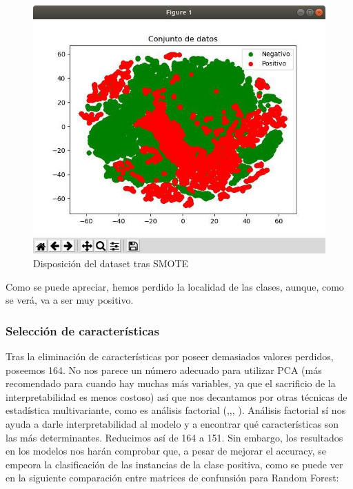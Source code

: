 \begin{figure}[H] %
	\centering
	\includegraphics[scale=0.55]{tras-smote.jpg}  %
	\caption{Disposición del dataset tras SMOTE} 
	\label{fig:post-smote}
\end{figure}

Como se puede apreciar, hemos perdido la localidad de las clases, aunque, como se verá, va a ser muy positivo.

\subsubsection{Selección de características}

Tras la eliminación de características por poseer demasiados valores perdidos, poseemos 164. No nos parece un número adecuado para utilizar PCA (más recomendado para cuando hay muchas más variables, ya que el sacrificio de la interpretabilidad es menos costoso) así que nos decantamos por otras técnicas de estadística multivariante, como es análisis factorial (\cite{ms},\cite{amsa},\cite{fa1}, \cite{fa2}). Análisis factorial sí nos ayuda a darle interpretabilidad al modelo y a encontrar qué características son las más determinantes. Reducimos así de 164 a 151. Sin embargo, los resultados en los modelos nos harán comprobar que, a pesar de mejorar el accuracy, se empeora la clasificación de las instancias de la clase positiva, como se puede ver en la siguiente comparación entre matrices de confunsión para Random Forest:

